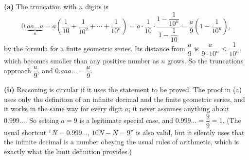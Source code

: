 \textbf{(a)} The truncation with $n$ digits is
\[0.\underbrace{aa\ldots a}_{n}=a\left(\dfrac{1}{10}+\dfrac{1}{10^2}+\cdots+\dfrac{1}{10^n}\right)=a\cdot\dfrac{1}{10}\cdot\dfrac{1-\dfrac{1}{10^n}}{1-\dfrac{1}{10}}=\dfrac {a}{9}\left(1-\dfrac{1}{10^n}\right),\]
by the formula for a finite geometric series. Its distance from $\dfrac {a}{9}$ is $\dfrac{a}{9\cdot10^n}\le\dfrac{1}{10^n}$, which becomes smaller than any positive number as $n$ grows. So the truncations approach $\dfrac {a}{9}$, and $0.aaa\ldots=\dfrac {a}{9}$.

\textbf{(b)} Reasoning is circular if it uses the statement to be proved. The proof in (a) uses only the definition of an infinite decimal and the finite geometric series, and it works in the same way for every digit $a$; it never assumes anything about $0.999\ldots$. So setting $a=9$ is a legitimate special case, and $0.999\ldots=\dfrac{9}{9}=1$. (The usual shortcut ``$N=0.999\ldots$, $10N-N=9$'' is also valid, but it silently uses that the infinite decimal is a number obeying the usual rules of arithmetic, which is exactly what the limit definition provides.)
